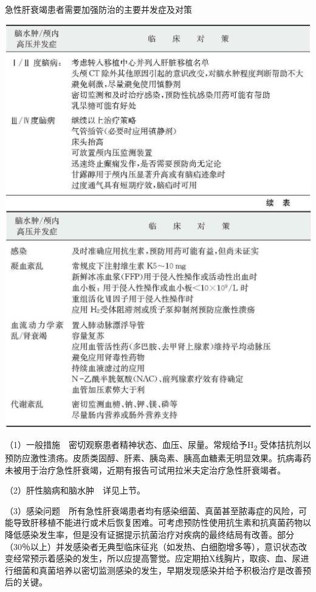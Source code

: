 \begin{table}[htbp]
\centering
\caption{急性肝衰竭患者需要加强防治的主要并发症及对策}
\label{tab13-3}
\includegraphics[width=\textwidth,height=\textheight,keepaspectratio]{./images/Image00106.jpg}
\includegraphics[width=\textwidth,height=\textheight,keepaspectratio]{./images/Image00107.jpg}
\end{table}


（1）一般措施　密切观察患者精神状态、血压、尿量。常规给予H\textsubscript{2}
受体拮抗剂以预防应激性溃疡。皮质类固醇、肝素、胰岛素、胰高血糖素无明显效果。抗病毒药未被用于治疗急性肝衰竭，近期有报告可试用拉米夫定治疗急性肝衰竭者。

（2）肝性脑病和脑水肿　详见上节。

（3）感染问题　所有急性肝衰竭患者均有感染细菌、真菌甚至脓毒症的风险，可能导致肝移植不能进行或术后恢复困难。可考虑预防性使用抗生素和抗真菌药物以降低感染发生率，但是没有证据提示抗菌治疗对疾病的最终结局有改善。部分（30％以上）并发感染者无典型临床征兆（如发热、白细胞增多等），意识状态改变经常预示着感染的发生，所以应提高警觉。应定期拍X线胸片，取痰、血、尿进行细菌和真菌培养以密切监测感染的发生，早期发现感染并给予积极治疗是改善预后的关键。

